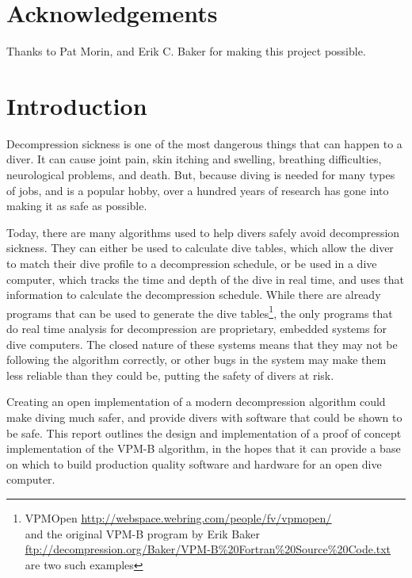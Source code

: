 \documentclass[12pt]{article}
\begin{document}
\newpage

\section*{Acknowledgements}
Thanks to Pat Morin, and Erik C. Baker for making this project possible.

\newpage

\setcounter{tocdepth}{3}
\tableofcontents
\listofalgorithms

\newpage

\section{Introduction}

 Decompression sickness is one of the most dangerous things that can happen to a diver. It can cause joint pain,
 skin itching and swelling, breathing difficulties, neurological problems, and death. But, because diving
 is needed for many types of jobs, and is a popular hobby, over a hundred years of research has gone into making
 it as safe as possible\cite{haldane07}.

 Today, there are many algorithms used to help divers safely avoid decompression sickness. They can either be
 used to calculate dive tables, which allow the diver to match their dive profile to a decompression schedule,
 or be used in a dive computer, which tracks the time and depth of the dive in real time, and uses that information
 to calculate the decompression schedule. While there are already programs that can be used to generate the
 dive tables\footnote{VPMOpen {\color{blue}\uline{\href{http://webspace.webring.com/people/fv/vpmopen/}{http://webspace.webring.com/people/fv/vpmopen/}}}\\ and the original VPM-B program by Erik Baker \\{\color{blue}\uline{\href{ftp://decompression.org/Baker/VPM-B\%20Fortran\%20Source\%20Code.txt}{ftp://decompression.org/Baker/VPM-B\%20Fortran\%20Source\%20Code.txt}}} are two such examples}, the only programs that do real time analysis for decompression are proprietary,
embedded systems for dive computers. The closed nature of these systems means that they may not be following
the algorithm correctly, or other bugs in the system may make them less reliable than they could be, putting
the safety of divers at risk.

Creating an open implementation of a modern decompression algorithm could make diving much safer, and
provide divers with software that could be shown to be safe. This report outlines the design and implementation
of a proof of concept implementation of the VPM-B 
algorithm, in the hopes that it can provide a base on 
which to build production quality software and hardware for an open dive computer.
\end{document}
